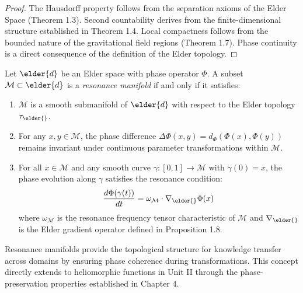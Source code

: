 \begin{proof}
The Hausdorff property follows from the separation axioms of the Elder Space (Theorem 1.3). Second countability derives from the finite-dimensional structure established in Theorem 1.4. Local compactness follows from the bounded nature of the gravitational field regions (Theorem 1.7). Phase continuity is a direct consequence of the definition of the Elder topology.
\end{proof}

\begin{definition}
Let $\elder{d}$ be an Elder space with phase operator $\Phi$. A subset $\mathcal{M} \subset \elder{d}$ is a \textit{resonance manifold} if and only if it satisfies:
\begin{enumerate}
    \item $\mathcal{M}$ is a smooth submanifold of $\elder{d}$ with respect to the Elder topology $\tau_{\elder{}}$.
    
    \item For any $x, y \in \mathcal{M}$, the phase difference $\Delta\Phi(x, y) = d_{\Phi}(\Phi(x), \Phi(y))$ remains invariant under continuous parameter transformations within $\mathcal{M}$.
    
    \item For all $x \in \mathcal{M}$ and any smooth curve $\gamma: [0,1] \rightarrow \mathcal{M}$ with $\gamma(0) = x$, the phase evolution along $\gamma$ satisfies the resonance condition:
    \begin{equation}
    \frac{d\Phi(\gamma(t))}{dt} = \omega_{\mathcal{M}} \cdot \nabla_{\elder{}} \Phi(x)
    \end{equation}
    where $\omega_{\mathcal{M}}$ is the resonance frequency tensor characteristic of $\mathcal{M}$ and $\nabla_{\elder{}}$ is the Elder gradient operator defined in Proposition 1.8.
\end{enumerate}
\end{definition}

\begin{remark}
Resonance manifolds provide the topological structure for knowledge transfer across domains by ensuring phase coherence during transformations. This concept directly extends to heliomorphic functions in Unit II through the phase-preservation properties established in Chapter 4.
\end{remark}

